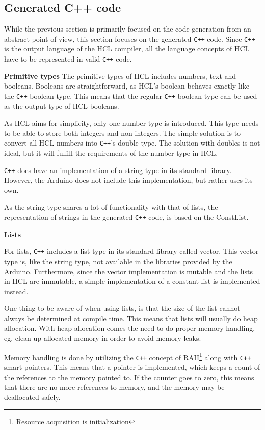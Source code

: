 
\subsection{Generated C++ code}
While the previous section is primarily focused on the code generation from an abstract point of view, this section focuses on the generated \texttt{C++} code.
Since \texttt{C++} is the output language of the HCL compiler, all the language concepts of HCL have to be represented in valid \texttt{C++} code.

\textbf{Primitive types}
The primitive types of HCL includes numbers, text and booleans. 
Booleans are straightforward, as HCL's boolean behaves exactly like the \texttt{C++} boolean type.
This means that the regular \texttt{C++} boolean type can be used as the output type of HCL booleans.

As HCL aims for simplicity, only one number type is introduced. 
This type needs to be able to store both integers and non-integers. 
The simple solution is to convert all HCL numbers into \texttt{C++}'s double type.
The solution with doubles is not ideal, but it will fulfill the requirements of the number type in HCL.

\texttt{C++} does have an implementation of a string type in its standard library.
However, the Arduino does not include this implementation, but rather uses its own.

As the string type shares a lot of functionality with that of lists, the representation of strings in the generated \texttt{C++} code, is based on the ConstList.

\textbf{Lists}

For lists, \texttt{C++} includes a list type in its standard library called vector. 
This vector type is, like the string type, not available in the libraries provided by the Arduino.
Furthermore, since the vector implementation is mutable and the lists in HCL are immutable, a simple implementation of a constant list is implemented instead.

One thing to be aware of when using lists, is that the size of the list cannot always be determined at compile time.
This means that lists will usually do heap allocation. 
With heap allocation comes the need to do proper memory handling, eg.
clean up allocated memory in order to avoid memory leaks.

Memory handling is done by utilizing the \texttt{C++} concept of RAII\footnote{Resource acquisition is initialization} along with \texttt{C++} smart pointers.
This means that a pointer is implemented, which keeps a count of the references to the memory pointed to.
If the counter goes to zero, this means that there are no more references to memory, and the memory may be deallocated safely.

